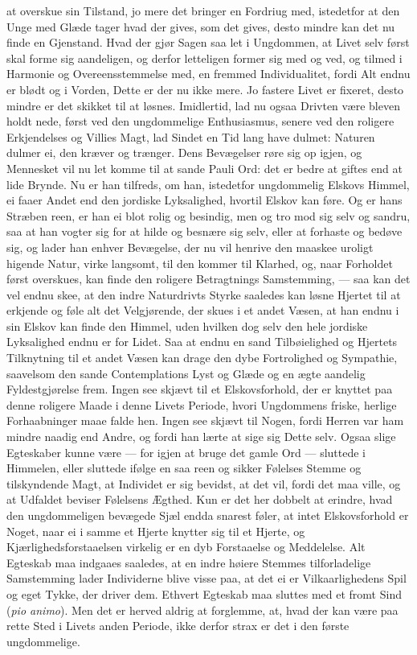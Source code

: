 \documentclass[12pt,a4paper]{book}
\newcommand{\apage}[1]{\marginnote{\footnotesize\textit{[#1]}}}
\begin{document}
at overskue sin Tilstand, jo mere det bringer en Fordriug med,
istedetfor at den Unge med Glæde tager hvad der gives, som det gives,
desto mindre kan det nu finde en Gjenstand. Hvad der gjør Sagen saa let
i Ungdommen, at Livet selv først skal forme sig aandeligen, og derfor
letteligen former sig med og ved, og tilmed i Harmonie og
Overeensstemmelse med, en fremmed Individualitet, fordi Alt endnu er
blødt og i Vorden, Dette er der nu ikke mere. Jo fastere Livet er
fixeret, desto mindre er det skikket til at løsnes. Imidlertid, lad nu
ogsaa Drivten være bleven holdt nede, først ved den ungdommelige
Enthusiasmus, senere ved den roligere Erkjendelses og Villies Magt, lad
Sindet en Tid lang have dulmet: Naturen dulmer ei, den kræver og
trænger. Dens Bevægelser røre sig op igjen, og Mennesket vil nu let
komme til at sande Pauli Ord: det er bedre at giftes end at lide Brynde.
Nu er han tilfreds, om han, istedetfor ungdommelig Elskovs Himmel, ei
faaer Andet end den jordiske Lyksalighed, hvortil Elskov kan føre. Og er
hans Stræben reen, er han ei blot rolig og besindig, men og tro mod sig
selv og sandru, saa at han vogter sig for at hilde og besnære sig selv,
eller at forhaste og bedøve sig, og lader han enhver Bevægelse, der nu
vil henrive den maaskee uroligt higende Natur, virke langsomt, \apage{77} til den
kommer til Klarhed, og, naar Forholdet først overskues, kan finde den
roligere Betragtnings Samstemming, --- saa kan det vel endnu skee, at
den indre Naturdrivts Styrke saaledes kan løsne Hjertet til at erkjende
og føle alt det Velgjørende, der skues i et andet Væsen, at han endnu i
sin Elskov kan finde den Himmel, uden hvilken dog selv den hele jordiske
Lyksalighed endnu er for Lidet. Saa at endnu en sand Tilbøielighed og
Hjertets Tilknytning til et andet Væsen kan drage den dybe Fortrolighed
og Sympathie, saavelsom den sande Contemplations Lyst og Glæde og en
ægte aandelig Fyldestgjørelse frem. Ingen see skjævt til et
Elskovsforhold, der er knyttet paa denne roligere Maade i denne Livets
Periode, hvori Ungdommens friske, herlige Forhaabninger maae falde hen.
Ingen see skjævt til Nogen, fordi Herren var ham mindre naadig end
Andre, og fordi han lærte at sige sig Dette selv. Ogsaa slige
Egteskaber kunne være --- for igjen at bruge det gamle Ord --- sluttede
i Himmelen, eller sluttede ifølge en saa reen og sikker Følelses Stemme
og tilskyndende Magt, at Individet er sig bevidst, at det vil, fordi det
maa ville, og at Udfaldet beviser Følelsens Ægthed. Kun er det her
dobbelt at erindre, hvad den ungdommeligen bevægede Sjæl endda snarest
føler, at intet Elskovsforhold er Noget, naar ei i samme et Hjerte
knytter sig til et Hjerte, og Kjærlighedsforstaaelsen virkelig er en dyb
Forstaaelse og Meddelelse. Alt Egteskab maa indgaaes saaledes, at en
indre høiere \apage{78} Stemmes tilforladelige Samstemming lader Individerne blive
visse paa, at det ei er Vilkaarlighedens Spil og eget Tykke, der driver
dem. Ethvert Egteskab maa sluttes med et fromt Sind (\textit{pio animo}). Men det
er herved aldrig at forglemme, at, hvad der kan være paa rette Sted i
Livets anden Periode, ikke derfor strax er det i den første
ungdommelige.
\end{document}
